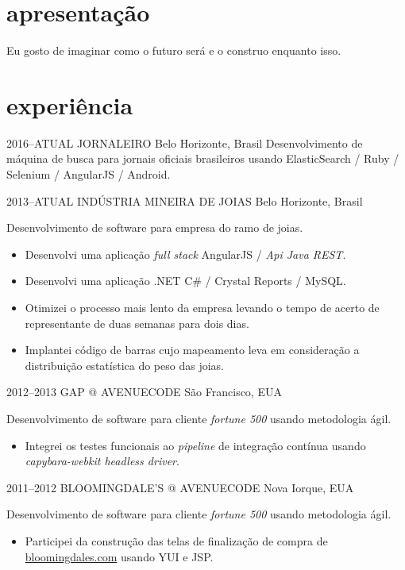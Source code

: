 \documentclass[]{friggeri-cv}
\begin{document}
\section{apresentação}
Eu gosto de imaginar como o futuro será e o construo enquanto isso.

\section{experiência}

\begin{entrylist}


\entry
{2016--ATUAL}
{JORNALEIRO}
{Belo Horizonte, Brasil}
{ Desenvolvimento de máquina de busca para jornais oficiais brasileiros usando ElasticSearch / Ruby / Selenium / AngularJS / Android.
}

\entry
{2013--ATUAL}
{INDÚSTRIA MINEIRA DE JOIAS}
{Belo Horizonte, Brasil}
{ Desenvolvimento de software para empresa do ramo de joias.

  \begin{itemize}
    \item Desenvolvi uma aplicação \textit{full stack} AngularJS / \textit{Api Java REST}.
    \item Desenvolvi uma aplicação .NET C\# / Crystal Reports / MySQL.
    \item Otimizei o processo mais lento da empresa levando o tempo de acerto de representante de duas semanas para dois dias.
    \item Implantei código de barras cujo mapeamento leva em consideração a distribuição estatística do peso das joias.
  \end{itemize}
  }


\entry
{2012--2013}
{GAP @ AVENUECODE}
{São Francisco, EUA}
{ Desenvolvimento de software para cliente \textit{fortune 500} usando metodologia ágil.
  \begin{itemize}
    \item Integrei os testes funcionais ao \textit{pipeline} de integração contínua usando \textit{capybara-webkit headless driver}.
  \end{itemize}
}



\entry
{2011--2012}
{BLOOMINGDALE'S @ AVENUECODE}
{Nova Iorque, EUA}
{ Desenvolvimento de software para cliente \textit{fortune 500} usando metodologia ágil.

  \begin{itemize}
    \item Participei da construção das telas de finalização de compra de \href{http://www.bloomingdales.com}{bloomingdales.com} usando YUI e JSP.
  \end{itemize}
}


\end{entrylist}
\end{document}
